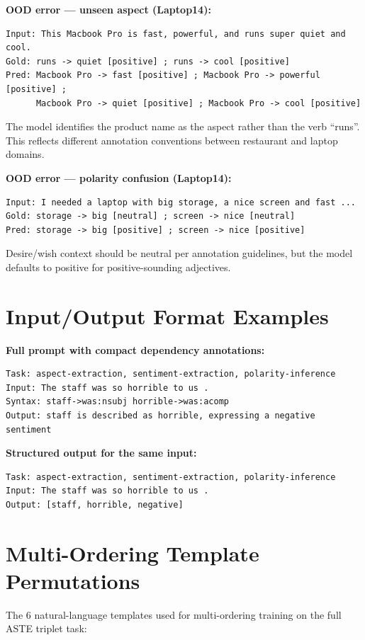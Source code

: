 \documentclass[12pt,a4paper]{report}
\begin{document}
\textbf{OOD error --- unseen aspect (Laptop14):}
\begin{lstlisting}
Input: This Macbook Pro is fast, powerful, and runs super quiet and cool.
Gold: runs -> quiet [positive] ; runs -> cool [positive]
Pred: Macbook Pro -> fast [positive] ; Macbook Pro -> powerful [positive] ;
      Macbook Pro -> quiet [positive] ; Macbook Pro -> cool [positive]
\end{lstlisting}
The model identifies the product name as the aspect rather than the verb ``runs''. This reflects different annotation conventions between restaurant and laptop domains.

\textbf{OOD error --- polarity confusion (Laptop14):}
\begin{lstlisting}
Input: I needed a laptop with big storage, a nice screen and fast ...
Gold: storage -> big [neutral] ; screen -> nice [neutral]
Pred: storage -> big [positive] ; screen -> nice [positive]
\end{lstlisting}
Desire/wish context should be neutral per annotation guidelines, but the model defaults to positive for positive-sounding adjectives.

\section{Input/Output Format Examples}

\textbf{Full prompt with compact dependency annotations:}
\begin{lstlisting}
Task: aspect-extraction, sentiment-extraction, polarity-inference
Input: The staff was so horrible to us .
Syntax: staff->was:nsubj horrible->was:acomp
Output: staff is described as horrible, expressing a negative sentiment
\end{lstlisting}

\textbf{Structured output for the same input:}
\begin{lstlisting}
Task: aspect-extraction, sentiment-extraction, polarity-inference
Input: The staff was so horrible to us .
Output: [staff, horrible, negative]
\end{lstlisting}


\section{Multi-Ordering Template Permutations}\label{sec:annex-templates}

The 6 natural-language templates used for multi-ordering training on the full ASTE triplet task:
\end{document}
